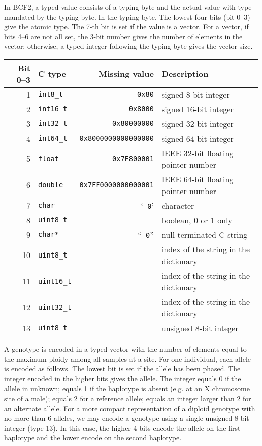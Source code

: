 \documentclass[10pt]{article}
\begin{document}
In BCF2, a typed value consists of a typing byte and the actual value with type
mandated by the typing byte. In the typing byte, The lowest four bits (bit
0--3) give the atomic type. The 7-th bit is set if the value is a vector. For a
vector, if bits 4--6 are not all set, the 3-bit number gives the number of
elements in the vector; otherwise, a typed integer following the typing byte
gives the vector size.
\begin{center}
{\small\begin{tabular}{rlrl}
\hline
Bit 0--3 & C type & Missing value & Description \\
\hline
1 & {\tt int8\_t}   & {\tt 0x80}               & signed 8-bit integer \\
2 & {\tt int16\_t}  & {\tt 0x8000}             & signed 16-bit integer \\
3 & {\tt int32\_t}  & {\tt 0x80000000}         & signed 32-bit integer \\
4 & {\tt int64\_t}  & {\tt 0x8000000000000000} & signed 64-bit integer \\
5 & {\tt float}     & {\tt 0x7F800001}         & IEEE 32-bit floating pointer number \\
6 & {\tt double}    & {\tt 0x7FF0000000000001} & IEEE 64-bit floating pointer number \\
7 & {\tt char}      & `{\tt \char92 0}'        & character \\
8 & {\tt uint8\_t}  &                    & boolean, 0 or 1 only \\
9 & {\tt char*}     & ``{\tt\char92 0}'' & null-terminated C string \\
10 & {\tt uint8\_t} &                    & index of the string in the dictionary \\
11 & {\tt uint16\_t}&                    & index of the string in the dictionary \\
12 & {\tt uint32\_t}&                    & index of the string in the dictionary \\
13 & {\tt uint8\_t} &                    & unsigned 8-bit integer \\
\hline
\end{tabular}}
\end{center}

A genotype is encoded in a typed vector with the number of elements equal to
the maximum ploidy among all samples at a site. For one individual, each allele
is encoded as follows. The lowest bit is set if the allele has been phased.
The integer encoded in the higher bits gives the allele. The integer equals
0 if the allele in unknown; equals 1 if the haplotype is absent (e.g. at an
X chromosome site of a male); equals 2 for a reference allele; equals an
integer larger than 2 for an alternate allele. For a more compact
representation of a diploid genotype with no more than 6 alleles, we may
encode a genotype using a single unsigned 8-bit integer (type 13). In this
case, the higher 4 bits encode the allele on the first haplotype and the lower
encode on the second haplotype.
\end{document}
